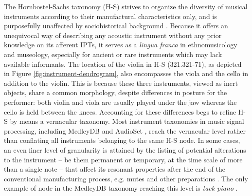 \documentclass{article}
\makeatletter
\newcommand*{\eg}{e.g.\@\xspace}
\makeatother
\begin{document}
The Hornbostel-Sachs taxonomy (H-S) strives to organize the diversity of musical instruments according to their manufactural characteristics only, and is purposefully unaffected by sociohistorical background \cite{montagu2009muzyka}.
Because it offers an unequivocal way of describing any acoustic instrument without any prior knowledge on its afferent IPTs, it serves as a \emph{lingua franca} in ethnomusicology and museology, especially for ancient or rare instruments which may lack available informants.
The location of the violin in H-S (321.321-71), as depicted in Figure \ref{fig:instrument-dendrogram}, also encompasses the viola and the cello in addition to the violin.
This is because these three instruments, viewed as inert objects, share a common morphology, despite differences in posture for the performer: both violin and viola are usually played under the jaw whereas the cello is held between the knees.
Accounting for these differences begs to refine H-S by means a vernacular taxonomy.
Most instrument taxonomies in music signal processing, including MedleyDB and AudioSet \cite{gemmeke2017icassp}, reach the vernacular level rather than conflating all instruments belonging to the same H-S node.
In some cases, an even finer level of granularity is attained by the listing of potential alterations to the instrument -- be them permanent or temporary, at the time scale of more than a single note -- that affect its resonant properties after the end of the conventional manufacturing process, \eg{} mutes and other preparations \cite{dianova2007phd}.
The only example of node in the MedleyDB taxonomy reaching this level is \emph{tack piano} \cite{bittner2014ismir} .
\end{document}
